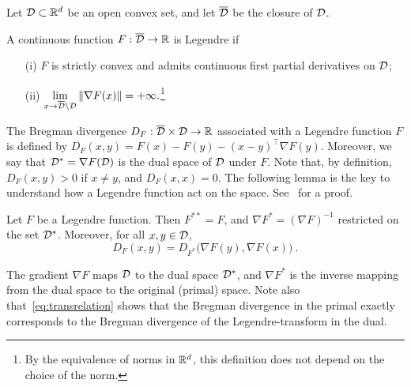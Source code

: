 Let $\mathcal{D} \subset \mathbb{R}^d$ be an open convex set, and let $\overline{\mathcal{D}}$ be the closure of $\mathcal{D}$. 
\begin{definition}
A continuous function $F:\overline{\mathcal{D}}\to\mathbb{R}$ is Legendre if 
\begin{itemize}
\item[(i)] $F$ is strictly convex and admits continuous first partial
derivatives on $\mathcal{D}$;
\item[(ii)] ${\displaystyle \lim_{x \to \overline{\mathcal{D}} \setminus \mathcal{D}} \left\|{\nabla F(x)}\right\| = +\infty.}$\footnote{By the equivalence of norms in $\mathbb{R}^d$, this definition does not depend on the choice of the norm.}
\end{itemize}
\end{definition}
%
The Bregman divergence $D_F: \overline{\mathcal{D}}\times\mathcal{D} \to \mathbb{R}$ associated with a Legendre function $F$ is defined by
  $
  D_F(x,y) = F(x) - F(y) - (x-y)^{\top} \nabla F(y)
  $. 
Moreover, we say that $\mathcal{D}^* = \nabla F (\mathcal{D})$ is the dual space of $\mathcal{D}$ under $F$.
Note that, by definition, $D_F(x,y) > 0$ if $x \neq y$, and $D_F(x,x)=0$. The following lemma is the key to understand how a Legendre function act on the space. See~\cite[Proposition~11.1]{CL06} for a proof.
%
\begin{lemma}
Let $F$ be a Legendre function. Then $F^{**} = F$, and $\nabla F^* = (\nabla F)^{-1}$ restricted on the set $\mathcal{D}^*$. Moreover, for all $x, y \in \mathcal{D}$,
\begin{equation} \label{eq:transrelation}
D_F(x,y) = D_{F^*}\bigl(\nabla F(y), \nabla F(x)\bigr)~.
\end{equation}
\end{lemma}
The gradient $\nabla F$ maps $\mathcal{D}$ to the dual space $\mathcal{D}^*$, and $\nabla F^*$ is the inverse mapping from the dual space to the original (primal) space. Note also that~\eqref{eq:transrelation} shows that the Bregman divergence in the primal exactly corresponds to the Bregman divergence of the Legendre-transform in the dual.

